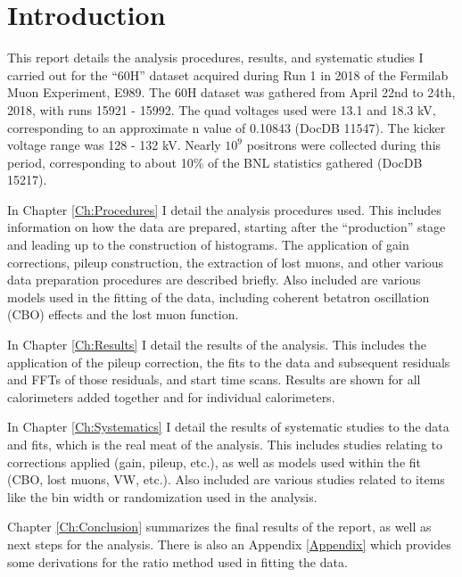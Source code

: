 \chapter{Introduction}
\label{Ch:Introduction}

This report details the analysis procedures, results, and systematic studies I carried out for the ``60H'' dataset acquired during Run 1 in 2018 of the Fermilab Muon \gmtwo Experiment, E989. The 60H dataset was gathered from April 22nd to 24th, 2018, with runs 15921 - 15992. The quad voltages used were 13.1 and 18.3 kV, corresponding to an approximate n value of 0.10843 (DocDB 11547). The kicker voltage range was 128 - 132 kV. Nearly $10^{9}$ positrons were collected during this period, corresponding to about 10\% of the BNL statistics gathered (DocDB 15217).

In Chapter \ref{Ch:Procedures} I detail the analysis procedures used. This includes information on how the data are prepared, starting after the ``production'' stage and leading up to the construction of histograms. The application of gain corrections, pileup construction, the extraction of lost muons, and other various data preparation procedures are described briefly. Also included are various models used in the fitting of the data, including coherent betatron oscillation (CBO) effects and the lost muon function.

In Chapter \ref{Ch:Results} I detail the results of the analysis. This includes the application of the pileup correction, the fits to the data and subsequent residuals and FFTs of those residuals, and start time scans. Results are shown for all calorimeters added together and for individual calorimeters.

In Chapter \ref{Ch:Systematics} I detail the results of systematic studies to the data and fits, which is the real meat of the analysis. This includes studies relating to corrections applied (gain, pileup, etc.), as well as models used within the fit (CBO, lost muons, VW, etc.). Also included are various studies related to items like the bin width or randomization used in the analysis.

Chapter \ref{Ch:Conclusion} summarizes the final results of the report, as well as next steps for the analysis. There is also an Appendix \ref{Appendix} which provides some derivations for the ratio method used in fitting the data.
